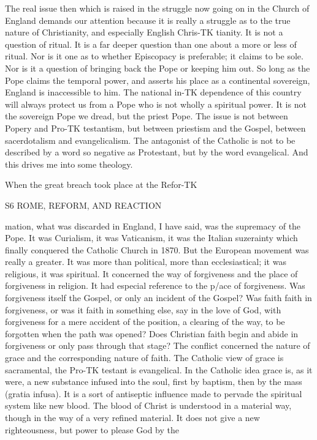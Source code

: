 \documentclass[12pt,a5paper,oneside]{book}
\begin{document}
The real issue then which is raised in the struggle 
now going on in the Church of England demands our 
attention because it is really a struggle as to the true 
nature of Christianity, and especially English Chris-TK
tianity. It is not a question of ritual. It is a far 
deeper question than one about a more or less of 
ritual. Nor is it one as to whether Episcopacy is 
preferable; it claims to be sole. Nor is it a 
question of bringing back the Pope or keeping him 
out. So long as the Pope claims the temporal power, 
and asserts his place as a continental sovereign, 
England is inaccessible to him. The national in-TK
dependence of this country will always protect us 
from a Pope who is not wholly a spiritual power. It 
is not the sovereign Pope we dread, but the priest 
Pope. The issue is not between Popery and Pro-TK
testantism, but between priestism and the Gospel, 
between sacerdotalism and evangelicalism. The 
antagonist of the Catholic is not to be described by 
a word so negative as Protestant, but by the word 
evangelical. And this drives me into some theology. 

When the great breach took place at the Refor-TK



S6 ROME, REFORM, AND REACTION 

mation, what was discarded in England, I have said, 
was the supremacy of the Pope. It was Curialism, 
it was Vaticanism, it was the Italian suzerainty 
which finally conquered the Catholic Church in 
1870. But the European movement was really a 
greater. It was more than political, more than 
ecclesiastical; it was religious, it was spiritual. It 
concerned the way of forgiveness and the place of 
forgiveness in religion. It had especial reference to 
the p/ace of forgiveness. Was forgiveness itself the 
Gospel, or only an incident of the Gospel? Was 
faith faith in forgiveness, or was it faith in something 
else, say in the love of God, with forgiveness for a 
mere accident of the position, a clearing of the way, 
to be forgotten when the path was opened? Does 
Christian faith begin and abide in forgiveness or only 
pass through that stage? The conflict concerned the 
nature of grace and the corresponding nature of faith. 
The Catholic view of grace is sacramental, the Pro-TK
testant is evangelical. In the Catholic idea grace is, 
as it were, a new substance infused into the soul, 
first by baptism, then by the mass (gratia infusa). 
It is a sort of antiseptic influence made to pervade 
the spiritual system like new blood. The blood of 
Christ is understood in a material way, though in the 
way of a very refined material. It does not give a 
new righteousness, but power to please God by the 
\end{document}
